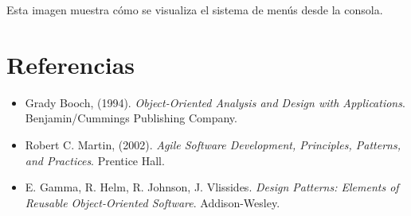 \documentclass[letterpaper,12pt]{article}
\begin{document}
\begin{multicols}{2}
    Esta imagen muestra cómo se visualiza el sistema de menús desde la consola.



    \section*{Referencias}
    \begin{itemize}
        \item Grady Booch, (1994). \textit{Object-Oriented Analysis and Design with Applications}. Benjamin/Cummings Publishing Company.
        \item Robert C. Martin, (2002). \textit{Agile Software Development, Principles, Patterns, and Practices}. Prentice Hall.
        \item E. Gamma, R. Helm, R. Johnson, J. Vlissides. \textit{Design Patterns: Elements of Reusable Object-Oriented Software}. Addison-Wesley.
    \end{itemize}

\end{multicols}
\end{document}
